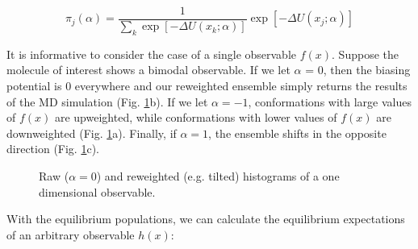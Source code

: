 \documentclass[journal=jacsat,manuscript=article]{achemso}
\begin{document}
$$\pi_j(\alpha) = \frac{1}{\sum_k \exp[-\Delta U(x_k;\alpha)]} \exp[-\Delta U(x_j;\alpha)]$$

It is informative to consider the case of a single observable $f(x)$.  Suppose the molecule of interest shows a bimodal observable.  If we let $\alpha$ = 0, then the biasing potential is $0$ everywhere and our reweighted ensemble simply returns the results of the MD simulation (Fig. \ref{figure:Hist}b).  If we let $\alpha = -1$, conformations with large values of $f(x)$ are upweighted, while conformations with lower values of $f(x)$ are downweighted (Fig. \ref{figure:Hist}a).  Finally, if $\alpha = 1$, the ensemble shifts in the opposite direction (Fig. \ref{figure:Hist}c).  

\begin{figure}

\caption{
Raw ($\alpha = 0$) and reweighted (e.g. tilted) histograms of a one dimensional observable.
}
\label{figure:Hist}
\end{figure}

With the equilibrium populations, we can calculate the equilibrium expectations of an arbitrary observable $h(x)$:
\end{document}
